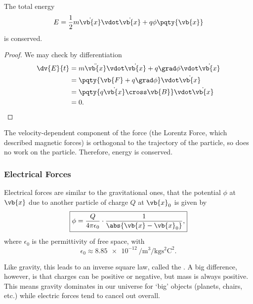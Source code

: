 \begin{proposition}
    \label{prop:conservation-of-energy-em-field}%
    The total energy
    \begin{equation}
        E = \frac{1}{2} m \dot{\vb{x}} \vdot \dot{\vb{x}} + q \phi\pqty{\vb{x}}
    \end{equation}
    is conserved.
\end{proposition}

\begin{proof}
    We may check by differentiation
    \begin{subequations}\begin{align}
        \dv{E}{t} &= m \ddot{\vb{x}} \vdot \dot{\vb{x}} + q \grad \phi \vdot \dot{\vb{x}} \\
        &= \pqty{\vb{F} + q \grad \phi} \vdot \dot{\vb{x}} \\
        &= \pqty{q \dot{\vb{x}} \cross \vb{B}} \vdot \dot{\vb{x}} \\
        &= 0.
    \end{align}\end{subequations}
\end{proof}

The velocity-dependent component of the force (the Lorentz Force, which described magnetic forces) is orthogonal to the trajectory of the particle, so does no work on the particle. Therefore, energy is conserved.

\subsubsection{Electrical Forces}

Electrical forces are similar to the gravitational ones, that the potential \(\phi\) at \(\vb{x}\) due to another particle of charge \(Q\) at \(\vb{x}_0\) is given by
\begin{equation}
    \boxed{\phi = \frac{Q}{4 \pi \epsilon_0} \cdot \frac{1}{\abs{\vb{x} - \vb{x}_0}},}
\end{equation}
where \(\epsilon_0\) is the permittivity of free space, with
\begin{equation}
    \epsilon_0 \approx \SI{8.85e-12}{\per\metre\cubed\per\kilogram \second\squared\coulomb\squared}.
\end{equation}

Like gravity, this leads to an inverse square law, called the . A big difference, however, is that charges can be positive or negative, but mass is always positive. This means gravity dominates in our universe for `big' objects (planets, chairs, etc.) while electric forces tend to cancel out overall.

